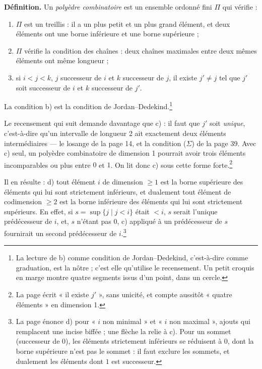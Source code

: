 \documentclass[11pt,a4paper]{article}
\begin{document}
\textbf{Définition.} Un \emph{polyèdre combinatoire} est un ensemble ordonné fini
$\Pi$ qui vérifie :
\begin{enumerate}
\item[a)] $\Pi$ est un treillis : il a un plus petit et un plus grand élément,
et deux éléments ont une borne inférieure et une borne supérieure ;
\item[b)] $\Pi$ vérifie la condition des chaînes : deux chaînes maximales entre
deux mêmes éléments ont même longueur ;
\item[c)] si $i < j < k$, $j$ successeur de $i$ et $k$ successeur de $j$, il
existe $j' \neq j$ tel que $j'$ soit successeur de $i$ et $k$ successeur de
$j'$.
\end{enumerate}
La condition b) est la condition de Jordan--Dedekind.\footnote{La lecture de b) comme condition de Jordan--Dedekind, c'est-à-dire
comme graduation, est la nôtre ; c'est elle qu'utilise le recensement. Un petit
croquis en marge montre quatre segments issus d'un point, dans un cercle.}

Le recensement qui suit demande davantage que c) : il faut que $j'$ soit
\emph{unique}, c'est-à-dire qu'un intervalle de longueur 2 ait exactement deux
éléments intermédiaires --- le losange de la page 14, et la condition
($\Sigma$) de la page 39. Avec c) seul, un polyèdre combinatoire de dimension 1
pourrait avoir trois éléments incomparables ou plus entre $0$ et $1$. On lit
donc c) sous cette forme forte.\footnote{La page écrit « il existe $j'$ »,
sans unicité, et compte aussitôt « quatre éléments » en dimension 1.}

Il en résulte : d) tout élément $i$ de dimension $\geq 1$ est la borne
supérieure des éléments qui lui sont strictement inférieurs, et dualement tout
élément de codimension $\geq 2$ est la borne inférieure des éléments qui lui
sont strictement supérieurs. En effet, si $s = \sup\{j \mid j < i\}$ était
$< i$, $s$ serait l'unique prédécesseur de $i$, et, $s$ n'étant pas $0$, c) appliqué
à un prédécesseur de $s$ fournirait un second prédécesseur de
$i$.\footnote{La page énonce d) pour « $i$ non minimal » et « $i$ non
maximal », ajouts qui remplacent une incise biffée ; une flèche la relie à c).
Pour un sommet (successeur de $0$), les éléments strictement inférieurs se
réduisent à $0$, dont la borne supérieure n'est pas le sommet : il faut
exclure les sommets, et dualement les éléments dont $1$ est successeur.}
\end{document}
